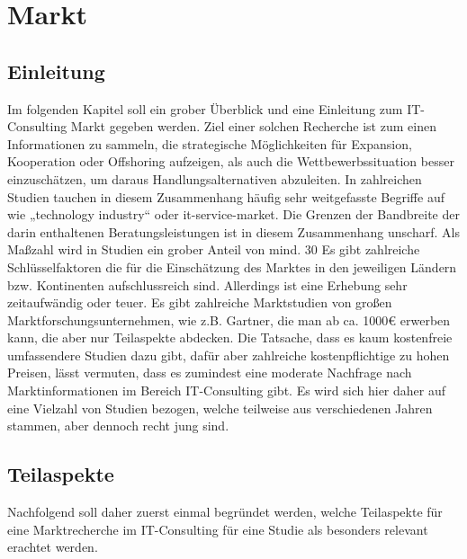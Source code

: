 \section{Markt}
\subsection{Einleitung}
Im folgenden Kapitel soll ein grober Überblick und eine Einleitung zum IT-Consulting Markt gegeben werden. 
Ziel einer solchen Recherche ist zum einen Informationen zu sammeln, die strategische Möglichkeiten für Expansion, Kooperation oder Offshoring aufzeigen, 
als auch die Wettbewerbssituation besser einzuschätzen, um daraus Handlungsalternativen abzuleiten. 
In zahlreichen Studien tauchen in diesem Zusammenhang häufig sehr weitgefasste Begriffe auf wie „technology industry“ oder it-service-market. 
Die Grenzen der Bandbreite der darin enthaltenen Beratungsleistungen ist in diesem Zusammenhang unscharf. 
Als Maßzahl wird in Studien ein grober Anteil von mind. 30%
Es gibt zahlreiche Schlüsselfaktoren die für die Einschätzung des Marktes in den jeweiligen Ländern bzw. Kontinenten aufschlussreich sind. 
Allerdings ist eine Erhebung sehr zeitaufwändig oder teuer. Es gibt zahlreiche Marktstudien von großen Marktforschungsunternehmen, wie z.B. Gartner, die man ab ca. 1000€  erwerben kann, die aber nur Teilaspekte abdecken. 
Die Tatsache, dass es kaum kostenfreie umfassendere Studien dazu gibt, dafür aber zahlreiche kostenpflichtige zu hohen Preisen, lässt vermuten, dass es zumindest eine moderate Nachfrage nach Marktinformationen im Bereich IT-Consulting gibt.
 Es wird sich hier daher auf eine Vielzahl von Studien bezogen, welche teilweise aus verschiedenen Jahren stammen, aber dennoch recht jung sind.

\subsection{Teilaspekte}
Nachfolgend soll daher zuerst einmal begründet werden, welche Teilaspekte für eine Marktrecherche im IT-Consulting für eine Studie als besonders relevant erachtet werden.
